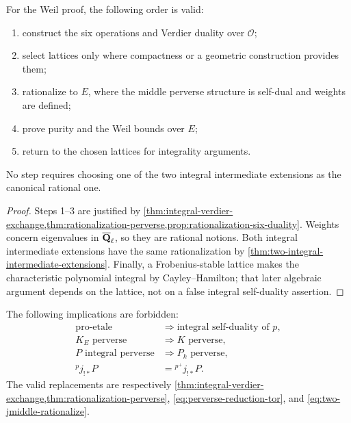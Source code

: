 \begin{proposition}
\label{prop:safe-lattice-route}
For the Weil proof, the following order is valid:
\begin{enumerate}
\item construct the six operations and Verdier duality over \(\mathcal O\);
\item select lattices only where compactness or a geometric construction
      provides them;
\item rationalize to \(E\), where the middle perverse structure is
      self-dual and weights are defined;
\item prove purity and the Weil bounds over \(E\);
\item return to the chosen lattices for integrality arguments.
\end{enumerate}
No step requires choosing one of the two integral intermediate extensions as
the canonical rational one.
\end{proposition}

\begin{proof}
Steps 1--3 are justified by
\cref{thm:integral-verdier-exchange,thm:rationalization-perverse,prop:rationalization-six-duality}.
Weights concern eigenvalues in \(\overline{\mathbf Q}_\ell\), so they are rational notions.
Both integral intermediate extensions have the same rationalization by
\cref{thm:two-integral-intermediate-extensions}.  Finally, a
Frobenius-stable lattice makes the characteristic polynomial integral by
Cayley--Hamilton; that later algebraic argument depends on the lattice, not
on a false integral self-duality assertion.
\end{proof}

\begin{auditbox}[title={Dependency firewall for integral coefficients}]
The following implications are forbidden:
\[
\begin{aligned}
 \text{pro-etale}&\Longrightarrow\text{integral self-duality of \(p\)},\\
 K_E\text{ perverse}&\Longrightarrow K\text{ perverse},\\
 P\text{ integral perverse}&\Longrightarrow P_k\text{ perverse},\\
 {}^p j_{!*}P&={} ^{p^+}j_{!*}P.
\end{aligned}
\]
The valid replacements are respectively
\cref{thm:integral-verdier-exchange,thm:rationalization-perverse},
\eqref{eq:perverse-reduction-tor}, and
\eqref{eq:two-jmiddle-rationalize}.
\end{auditbox}

